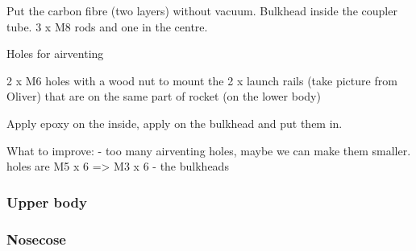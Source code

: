 Put the carbon fibre (two layers) without vacuum. 
Bulkhead inside the coupler tube.  3 x M8 rods and one in the centre. 


Holes for airventing


2 x M6 holes with a wood nut to mount the 2 x launch rails (take picture from Oliver) that are on the same part of rocket (on the lower body)



Apply epoxy on the inside, apply on the bulkhead and put them in. 



What to improve: 
- too many airventing holes, maybe we can make them smaller. holes are M5 x 6 => M3 x 6
- the bulkheads


\subsubsection{Upper body}

\subsubsection{Nosecose}